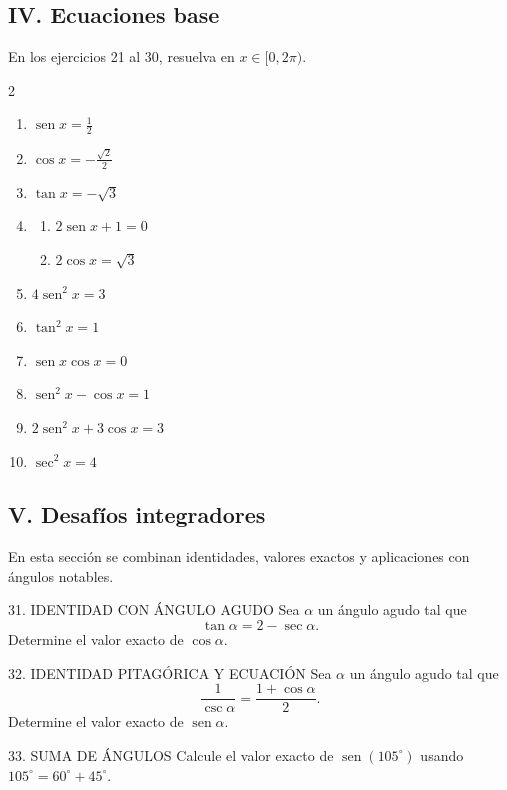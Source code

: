 \documentclass[letterpaper,12pt]{article}
\newcommand{\seno}{\operatorname{sen}}
\newcommand{\tituloSeccion}[1]{%
    \needspace{4\baselineskip}
    \subsection*{\color{azulFuerte}#1}
}
\begin{document}
\tituloSeccion{IV. Ecuaciones base}
\noindent En los ejercicios 21 al 30, resuelva en \(x\in[0,2\pi)\).

\begin{multicols}{2}
\begin{enumerate}[label=\color{azulFuerte}\textbf{\arabic*.},leftmargin=*,start=21,itemsep=0.65em]
    \item \(\seno x=\frac12\)
    \item \(\cos x=-\frac{\sqrt2}{2}\)
    \item \(\tan x=-\sqrt3\)
    \item
    \begin{enumerate}[label=\alph*),leftmargin=*]
        \item \(2\seno x+1=0\)
        \item \(2\cos x=\sqrt3\)
    \end{enumerate}
    \item \(4\seno^2x=3\)
    \item \(\tan^2x=1\)
    \item \(\seno x\cos x=0\)
    \item \(\seno^2x-\cos x=1\)
    \item \(2\seno^2x+3\cos x=3\)
    \item \(\sec^2x=4\)
\end{enumerate}
\end{multicols}

\tituloSeccion{V. Desafíos integradores}
\noindent En esta sección se combinan identidades, valores exactos y aplicaciones con ángulos notables.

\begin{desafiointegradorbox}{31. IDENTIDAD CON ÁNGULO AGUDO}
Sea \(\alpha\) un ángulo agudo tal que
\[
    \tan\alpha=2-\sec\alpha.
\]
Determine el valor exacto de \(\cos\alpha\).
\end{desafiointegradorbox}

\begin{desafiointegradorbox}{32. IDENTIDAD PITAGÓRICA Y ECUACIÓN}
Sea \(\alpha\) un ángulo agudo tal que
\[
    \frac{1}{\csc\alpha}=\frac{1+\cos\alpha}{2}.
\]
Determine el valor exacto de \(\seno\alpha\).
\end{desafiointegradorbox}

\begin{desafiointegradorbox}{33. SUMA DE ÁNGULOS}
Calcule el valor exacto de \(\seno(105^\circ)\) usando \(105^\circ=60^\circ+45^\circ\).
\end{desafiointegradorbox}
\end{document}
